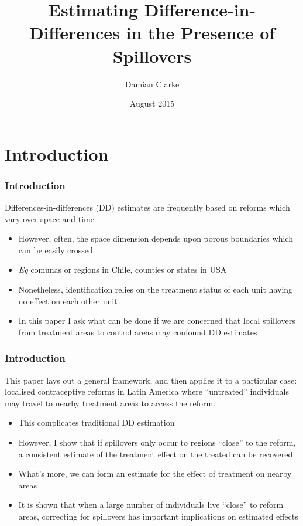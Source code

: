 \documentclass[10pt,letterpaper,subeqn]{beamer}
\title{Estimating Difference-in-Differences in the Presence of Spillovers}
\author{Damian Clarke\inst{\dag} }
\institute{\inst{\dag}  University of Oxford}
\date{August 2015}
\begin{document}
\begin{frame}
\titlepage
\end{frame}

\section{Introduction}
\begin{frame}[label=int1]
  \frametitle{Introduction}
Differences-in-differences (DD) estimates are frequently based on reforms which
vary over space and time
\vspace{7mm}
\begin{itemize}
\item However, often, the space dimension depends upon porous boundaries 
which can be easily crossed
\item \emph{Eg} comunas or regions in Chile, counties or states in USA
\item Nonetheless, identification relies on the treatment status of each unit
having no effect on each other unit
\item In this paper I ask what can be done if we are concerned that local 
spillovers from treatment areas to control areas may confound DD estimates
\end{itemize}
\end{frame}


\begin{frame}[label=int2]
  \frametitle{Introduction}
This paper lays out a general framework, and then applies it to a particular 
case: localised contraceptive reforms in Latin America where ``untreated'' 
individuals may travel to nearby treatment areas to access the reform.
\vspace{5mm}
\begin{itemize}
\item This complicates traditional DD estimation
\item However, I show that if spillovers only occur to regions ``close'' to the
reform, a consistent estimate of the treatment effect on the treated can be
recovered
\item What's more, we can form an estimate for the effect of treatment on
nearby areas
\item It is shown that when a large number of individuals live ``close'' to 
reform areas, correcting for spillovers has important implications on estimated 
effects
\end{itemize}
\end{frame}
\end{document}
